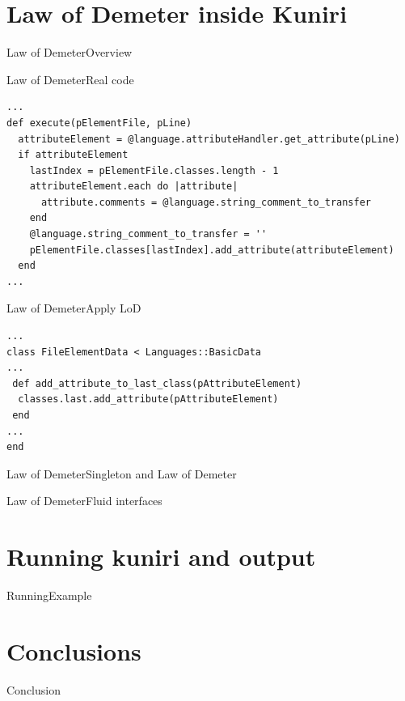 \documentclass[10pt]{beamer}
\begin{document}
\section{Law of Demeter inside Kuniri}
\begin{frame}{Law of Demeter}{Overview}
\end{frame}

\begin{frame}[fragile]{Law of Demeter}{Real code}
\small
\begin{lstlisting}
...
def execute(pElementFile, pLine)
  attributeElement = @language.attributeHandler.get_attribute(pLine)
  if attributeElement
    lastIndex = pElementFile.classes.length - 1
    attributeElement.each do |attribute|
      attribute.comments = @language.string_comment_to_transfer
    end
    @language.string_comment_to_transfer = ''
    pElementFile.classes[lastIndex].add_attribute(attributeElement)
  end
...
\end{lstlisting}
\end{frame}

\begin{frame}[fragile]{Law of Demeter}{Apply LoD}
\small
\begin{lstlisting}
...
class FileElementData < Languages::BasicData
...
 def add_attribute_to_last_class(pAttributeElement)
  classes.last.add_attribute(pAttributeElement)
 end
...
end
\end{lstlisting}
\end{frame}

\begin{frame}{Law of Demeter}{Singleton and Law of Demeter}
\end{frame}

\begin{frame}{Law of Demeter}{Fluid interfaces}
\end{frame}

\section{Running kuniri and output}
\begin{frame}{Running}{Example}
\end{frame}

\section{Conclusions}
\begin{frame}{Conclusion}{}
\end{frame}

{\1
\begin{frame}
\end{frame}}
\end{document}
